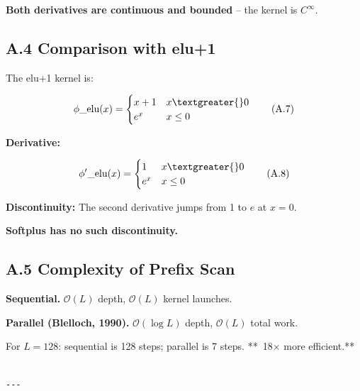 \textbf{Both derivatives are continuous and bounded} -- the kernel is $C^\infty$.

\subsection{A.4 Comparison with elu+1}

The elu+1 kernel is:

\[
\phi\_{\text{elu}}(x) = \begin{cases} x + 1 & x \textgreater{} 0 \\ e^x & x \le 0 \end{cases}
\tag{A.7}
\]

\textbf{Derivative:}

\[
\phi'\_{\text{elu}}(x) = \begin{cases} 1 & x \textgreater{} 0 \\ e^x & x \le 0 \end{cases}
\tag{A.8}
\]

\textbf{Discontinuity:} The second derivative jumps from 1 to $e$ at $x = 0$.

\textbf{Softplus has no such discontinuity.}

\subsection{A.5 Complexity of Prefix Scan}

\textbf{Sequential.} $\mathcal{O}(L)$ depth, $\mathcal{O}(L)$ kernel launches.

\textbf{Parallel (Blelloch, 1990).} $\mathcal{O}(\log L)$ depth, $\mathcal{O}(L)$ 
total work.

For $L = 128$: sequential is 128 steps; parallel is 7 steps. **~18$\times$ more 
efficient.**
\begin{lstlisting}

---
\end{lstlisting}